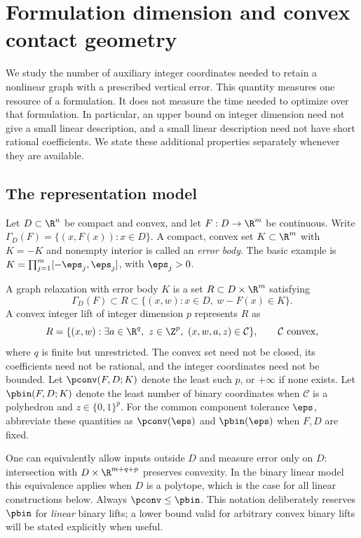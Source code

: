 \section{Formulation dimension and convex contact geometry}\label{sec:foundations}

We study the number of auxiliary integer coordinates needed to retain a
nonlinear graph with a prescribed vertical error. This quantity measures
one resource of a formulation. It does not measure the time needed to
optimize over that formulation. In particular, an upper bound on integer
dimension need not give a small linear description, and a small linear
description need not have short rational coefficients. We state these
additional properties separately whenever they are available.

\subsection{The representation model}

Let $D\subset\R^n$ be compact and convex, and let $F:D\to\R^m$ be
continuous. Write $\Gamma_D(F)=\{(x,F(x)):x\in D\}$. A compact, convex
set $K\subset\R^m$ with $K=-K$ and nonempty interior is called
an \emph{error body}. The basic example is
$K=\prod_{j=1}^m[-\eps_j,\eps_j]$, with $\eps_j>0$.

\begin{definition}\label{def:dimension}
A graph relaxation with error body $K$ is a set $R\subset D\times\R^m$
satisfying
\[
 \Gamma_D(F)\subset R\subset
 \{(x,w):x\in D,\ w-F(x)\in K\}.
\]
A convex integer lift of integer dimension $p$ represents $R$ as
\begin{equation}\label{eq:convex-lift}
 R=\{(x,w):\exists a\in\R^q,\ z\in\Z^p,
                  \ (x,w,a,z)\in\mathcal C\},
 \qquad \mathcal C\text{ convex},
\end{equation}
where $q$ is finite but unrestricted. The convex set need not be closed,
its coefficients need not be rational, and the integer coordinates need
not be bounded. Let $\pconv(F,D;K)$ denote the least such $p$, or $+\infty$
if none exists. Let $\pbin(F,D;K)$ denote the least number of binary
coordinates when $\mathcal C$ is a polyhedron and $z\in\{0,1\}^p$.
For the common component tolerance $\eps$, abbreviate these quantities
as $\pconv(\eps)$ and $\pbin(\eps)$ when $F,D$ are fixed.
\end{definition}

One can equivalently allow inputs outside $D$ and measure error only on
$D$: intersection with $D\times\R^{m+q+p}$ preserves convexity. In the
binary linear model this equivalence applies when $D$ is a polytope,
which is the case for all linear constructions below. Always
$\pconv\le\pbin$. This notation deliberately reserves $\pbin$ for
\emph{linear} binary lifts; a lower bound valid for arbitrary convex
binary lifts will be stated explicitly when useful.

